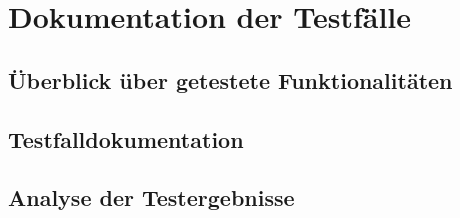\section{Dokumentation der Testfälle}\label{Dokumentation der Testfälle}

\subsection{Überblick über getestete Funktionalitäten}



\subsection{Testfalldokumentation}


\subsection{Analyse der Testergebnisse}